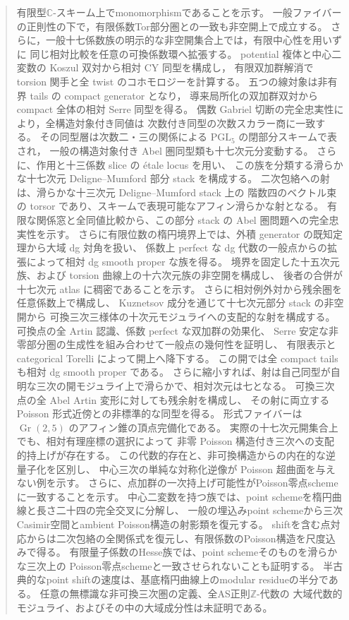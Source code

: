 \documentclass[11pt,a4paper]{ltjsarticle}
\numberwithin{equation}{section}
\newcommand{\C}{\mathbb C}
\newcommand{\PGL}{\mathrm{PGL}}
\begin{document}
\begin{abstract}
有限型$\C$-スキーム上でmonomorphismであることを示す。
一般ファイバーの正則性の下で，有限係数Tor部分圏との一致も非空開上で成立する。
さらに，一般十七係数族の明示的な非空開集合上では，有限中心性を用いずに
同じ相対比較を任意の可換係数環へ拡張する。
potential 複体と中心二変数の Koszul 双対から相対 CY 同型を構成し，
有限双加群解消で torsion 関手と全 twist のコホモロジーを計算する。
五つの線対象は非有界 tails の compact generator となり，
導来局所化の双加群双対から compact 全体の相対 Serre 同型を得る。
偶数 Gabriel 切断の完全忠実性により，全構造対象付き同値は
次数付き同型の次数スカラー商に一致する。
その同型層は次数二・三の関係による $\PGL_5$ の閉部分スキームで表され，
一般の構造対象付き Abel 圏同型類も十七次元分変動する。
さらに、作用と十三係数 slice の étale locus を用い、
この族を分類する滑らかな十七次元 Deligne--Mumford 部分 stack を構成する。
二次包絡への射は、滑らかな十三次元 Deligne--Mumford stack 上の
階数四のベクトル束の torsor であり、スキームで表現可能なアフィン滑らかな射となる。
有限な関係窓と全同値比較から、この部分 stack の Abel 圏問題への完全忠実性を示す。
さらに有限位数の楕円境界上では、外積 generator の既知定理から大域 dg 対角を扱い、
係数上 perfect な dg 代数の一般点からの拡張によって相対 dg smooth proper な族を得る。
境界を固定した十五次元族、および torsion 曲線上の十六次元族の非空開を構成し、
後者の合併が十七次元 atlas に稠密であることを示す。
さらに相対例外対から残余圏を任意係数上で構成し、
Kuznetsov 成分を通じて十七次元部分 stack の非空開から
可換三次三様体の十次元モジュライへの支配的な射を構成する。
可換点の全 Artin 認識、係数 perfect な双加群の効果化、
Serre 安定な非零部分圏の生成性を組み合わせて一般点の幾何性を証明し、
有限表示と categorical Torelli によって開上へ降下する。
この開では全 compact tails も相対 dg smooth proper である。
さらに縮小すれば、射は自己同型が自明な三次の開モジュライ上で滑らかで、相対次元は七となる。
可換三次点の全 Abel Artin 変形に対しても残余射を構成し、
その射に両立する Poisson 形式近傍との非標準的な同型を得る。
形式ファイバーは $\operatorname{Gr}(2,5)$ のアフィン錐の頂点完備化である。
実際の十七次元開集合上でも、相対有理座標の選択によって
非零 Poisson 構造付き三次への支配的持上げが存在する。
この代数的存在と、非可換構造からの内在的な逆量子化を区別し、
中心三次の単純な対称化逆像が Poisson 超曲面を与えない例を示す。
さらに、点加群の一次持上げ可能性がPoisson零点schemeに一致することを示す。
中心二変数を持つ族では、point schemeを楕円曲線と長さ二十四の完全交叉に分解し、
一般の埋込みpoint schemeから三次Casimir空間とambient Poisson構造の射影類を復元する。
shiftを含む点対応からは二次包絡の全関係式を復元し、有限係数のPoisson構造を尺度込みで得る。
有限量子係数のHesse族では、point schemeそのものを滑らかな三次上の
Poisson零点schemeと一致させられないことも証明する。
半古典的なpoint shiftの速度は、基底楕円曲線上のmodular residueの半分である。
任意の無標識な非可換三次圏の定義、全AS正則$\mathbb Z$-代数の
大域代数的モジュライ、およびその中の大域成分性は未証明である。
\end{abstract}
\tableofcontents
\end{document}
